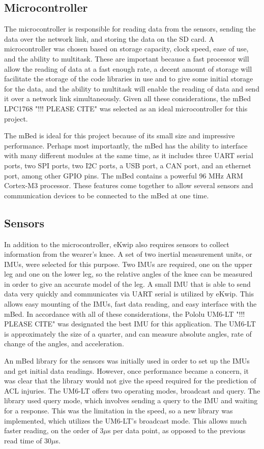 \subsection {Microcontroller}
The microcontroller is responsible for reading data from the sensors, sending the data over the network link, and storing the data on the SD card. A microcontroller was chosen based on storage capacity, clock speed, ease of use, and the ability to multitask. These are important because a fast processor will allow the reading of data at a fast enough rate, a decent amount of storage will facilitate the storage of the code libraries in use and to give some initial storage for the data, and the ability to multitask will enable the reading of data and send it over a network link simultaneously. Given all these considerations, the mBed LPC1768 "!!! PLEASE CITE" was selected as an ideal microcontroller for this project.

The mBed is ideal for this project because of its small size and impressive performance. Perhaps most importantly, the mBed has the ability to interface with many different modules at the same time, as it includes three UART serial ports, two SPI ports, two I2C ports, a USB port, a CAN port, and an ethernet port, among other GPIO pins. The mBed contains a powerful 96 MHz ARM Cortex-M3 processor. These features come together to allow several sensors and communication devices to be connected to the mBed at one time.

\subsection {Sensors}
In addition to the microcontroller, eKwip also requires sensors to collect information from the wearer's knee. A set of two inertial measurement units, or IMUs, were selected for this purpose. Two IMUs are required, one on the upper leg and one on the lower leg, so the relative angles of the knee can be measured in order to give an accurate model of the leg. A small IMU that is able to send data very quickly and communicates via UART serial is utilized by eKwip. This allows easy mounting of the IMUs, fast data reading, and easy interface with the mBed. In accordance with all of these considerations, the Pololu UM6-LT "!!! PLEASE CITE" was designated the best IMU for this application. The UM6-LT is approximately the size of a quarter, and can measure absolute angles, rate of change of the angles, and acceleration.

An mBed library for the sensors was initially used in order to set up the IMUs and get initial data readings. However, once performance became a concern, it was clear that the library would not give the speed required for the prediction of ACL injuries. The UM6-LT offers two operating modes, broadcast and query. The library used query mode, which involves sending a query to the IMU and waiting for a response. This was the limitation in the speed, so a new library was implemented, which utilizes the UM6-LT's broadcast mode. This allows much faster reading, on the order of 3$\mu$s per data point, as opposed to the previous read time of 30$\mu$s.